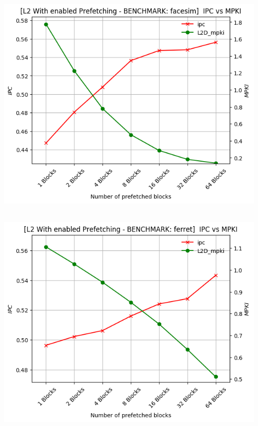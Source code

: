 \begin{minipage}{\textwidth}
    \begin{center}
        \\
        \vspace{3mm}
        \includegraphics[scale=0.70]{graphs/PREF/facesim.png}
        \vspace{6mm}
    \end{center}
\end{minipage}

\begin{minipage}{\textwidth}
    \begin{center}
        \\
        \vspace{3mm}
        \includegraphics[scale=0.70]{graphs/PREF/ferret.png}
        \vspace{6mm}
    \end{center}
\end{minipage}


